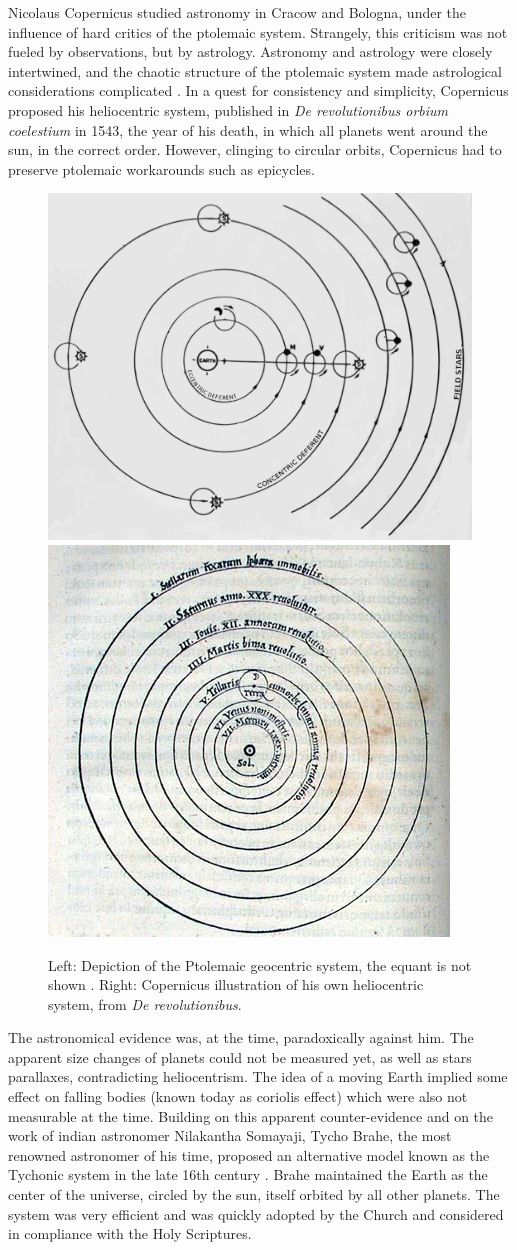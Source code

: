 Nicolaus Copernicus studied astronomy in Cracow and Bologna, under the influence of hard critics of the ptolemaic system. Strangely, this criticism was not fueled by observations, but by astrology. Astronomy and astrology were closely intertwined, and the chaotic structure of the ptolemaic system made astrological considerations complicated \citep{Barker2014}. In a quest for consistency and simplicity, Copernicus proposed his heliocentric system, published in \textit{De revolutionibus orbium coelestium} in 1543, the year of his death, in which all planets went around the sun, in the correct order. However, clinging to circular orbits, Copernicus had to preserve ptolemaic workarounds such as epicycles. 


\begin{figure}
\center
\includegraphics[width=0.45\linewidth]{Figures/0_PtolemaicModel.png}
\includegraphics[width=0.38\linewidth]{Figures/0_CopernicusModel.jpg}
\caption{ Left: Depiction of the Ptolemaic geocentric system, the equant is not shown . Right: Copernicus illustration of his own heliocentric system, from \textit{De revolutionibus}. }
\label{Fig:0_PtolemyCopernicus}
\end{figure}



The astronomical evidence was, at the time, paradoxically against him. The apparent size changes of planets could not be measured yet, as well as stars parallaxes, contradicting heliocentrism. The idea of a moving Earth implied some effect on falling bodies (known today as coriolis effect) which were also not measurable at the time. Building on this apparent counter-evidence and on the work of indian astronomer Nilakantha Somayaji, Tycho Brahe, the most renowned astronomer of his time, proposed an alternative model known as the Tychonic system in the late 16th century \citep{ramasubramanian1998}. Brahe maintained the Earth as the center of the universe, circled by the sun, itself orbited by all other planets. The system was very efficient and was quickly adopted by the Church and considered in compliance with the Holy Scriptures.

